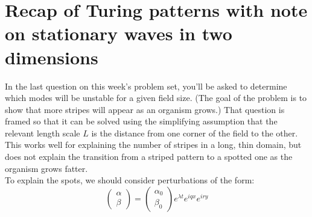 \documentclass{article}
\begin{document}
\large

\section*{Recap of Turing patterns with note on stationary waves in two dimensions}

In the last question on this week's problem set, you'll be asked to determine which modes will be unstable for a given field size. (The goal of the problem is to show that more stripes will appear as an organism grows.) That question is framed so that it can be solved using the simplifying assumption that the relevant length scale $L$ is the distance from one corner of the field to the other. This works well for explaining the number of stripes in a long, thin domain, but does not explain the transition from a striped pattern to a spotted one as the organism grows fatter.\\

To explain the spots, we should consider perturbations of the form:
\[ \begin{pmatrix} \alpha\\ \beta \end{pmatrix} = \begin{pmatrix} \alpha_0\\ \beta_0 \end{pmatrix} e^{\lambda t} e^{iqx} e^{iry} \]
\end{document}
